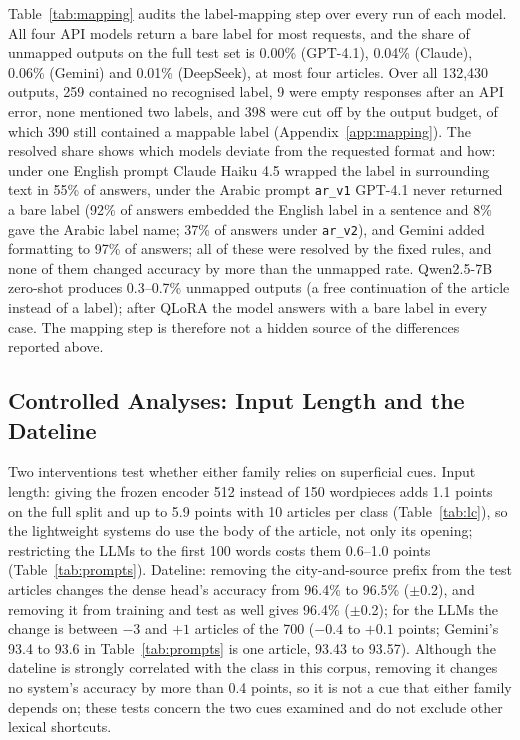 \documentclass[preprint,12pt,authoryear]{elsarticle}
\newif\ifrevmarkup
\DeclareRobustCommand{\rev}[1]{\ifrevmarkup{\color{blue}#1}\else#1\fi}
\newcommand{\revblock}{\ifrevmarkup\color{blue}\fi}
\begin{document}
\rev{Table~\ref{tab:mapping} audits the label-mapping step over every run of each model. All four API models return a bare label for most requests, and the share of unmapped outputs on the full test set is 0.00\% (GPT-4.1), 0.04\% (Claude), 0.06\% (Gemini) and 0.01\% (DeepSeek), at most four articles. Over all 132,430 outputs, 259 contained no recognised label, 9 were empty responses after an API error, none mentioned two labels, and 398 were cut off by the output budget, of which 390 still contained a mappable label (Appendix~\ref{app:mapping}). The resolved share shows which models deviate from the requested format and how: under one English prompt Claude Haiku 4.5 wrapped the label in surrounding text in 55\% of answers, under the Arabic prompt \texttt{ar\_v1} GPT-4.1 never returned a bare label (92\% of answers embedded the English label in a sentence and 8\% gave the Arabic label name; 37\% of answers under \texttt{ar\_v2}), and Gemini added formatting to 97\% of answers; all of these were resolved by the fixed rules, and none of them changed accuracy by more than the unmapped rate. Qwen2.5-7B zero-shot produces 0.3--0.7\% unmapped outputs (a free continuation of the article instead of a label); after QLoRA the model answers with a bare label in every case. The mapping step is therefore not a hidden source of the differences reported above.}

{\revblock}

\subsection{\rev{Controlled Analyses: Input Length and the Dateline}}
\label{sec:controls}

\rev{Two interventions test whether either family relies on superficial cues. Input length: giving the frozen encoder 512 instead of 150 wordpieces adds 1.1 points on the full split and up to 5.9 points with 10 articles per class (Table~\ref{tab:lc}), so the lightweight systems do use the body of the article, not only its opening; restricting the LLMs to the first 100 words costs them 0.6--1.0 points (Table~\ref{tab:prompts}). Dateline: removing the city-and-source prefix from the test articles changes the dense head's accuracy from 96.4\% to 96.5\% ($\pm$0.2), and removing it from training and test as well gives 96.4\% ($\pm$0.2); for the LLMs the change is between $-3$ and $+1$ articles of the 700 ($-0.4$ to $+0.1$ points; Gemini's 93.4 to 93.6 in Table~\ref{tab:prompts} is one article, 93.43 to 93.57). Although the dateline is strongly correlated with the class in this corpus, removing it changes no system's accuracy by more than 0.4 points, so it is not a cue that either family depends on; these tests concern the two cues examined and do not exclude other lexical shortcuts.}
\end{document}
